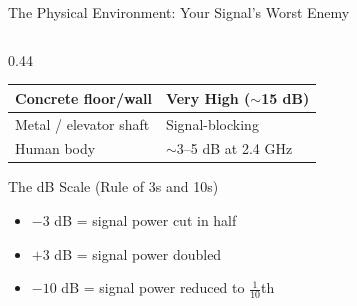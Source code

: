 \documentclass[aspectratio=169]{beamer}
\begin{document}
\begin{frame}{The Physical Environment: Your Signal's Worst Enemy}
\begin{columns}[T]
\begin{column}{0.44\textwidth}
\begin{table}[]
\begin{tabular}{|l|l|}
                Concrete floor/wall & Very High ($\sim$15 dB) \\ \hline
                Metal / elevator shaft & Signal-blocking \\ \hline
                Human body & $\sim$3--5 dB at 2.4 GHz \\ \hline
                \end{tabular}
            \end{table}
            \vspace{0.2em}
            \begin{exampleblock}{The dB Scale (Rule of 3s and 10s)}
                \scriptsize
                \begin{itemize}
                    \item $-3$ dB = signal power cut in half
                    \item $+3$ dB = signal power doubled
                    \item $-10$ dB = signal power reduced to $\frac{1}{10}$th
                \end{itemize}
            \end{exampleblock}
        \end{column}
    \end{columns}
\end{frame}
\end{document}
